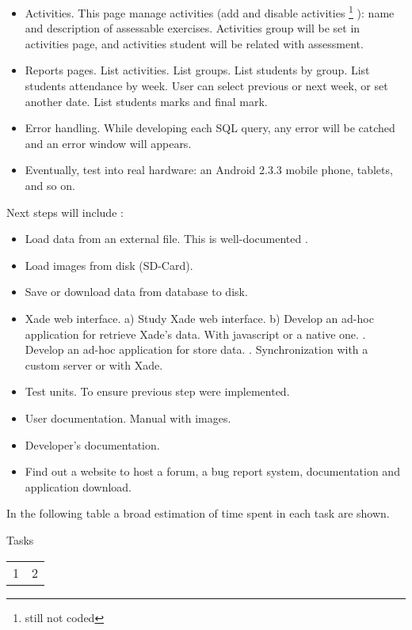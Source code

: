 \begin{itemize}
  \item  Activities. This page manage activities (add and disable activities \footnote{still not coded} ): name and description of assessable exercises. 
  \subitem  Activities group will be set in activities page, and activities student will be related with assessment.
  \item Reports pages.
  \subitem  List activities.
  \subitem  List groups.
  \subitem  List students by group.
  \subitem  List students attendance by week. User can select previous or next week, or set another date.
  \subitem  List students marks and final mark.
  
  \item Error handling. While developing each SQL query, any error will be catched and an error window will appears. 
  \item Eventually, test into real hardware: an Android 2.3.3 mobile phone, tablets, and so on.
  \end{itemize}
  
	   Next steps will include :  
  \begin{itemize}
  \item   Load data from an external file. This is well-documented \cite{}.  
  \item   Load images from disk (SD-Card).
  \item  Save or download data from database to disk.
  \item  Xade web interface.
  \subitem    a) Study Xade web interface.
  \subitem    b) Develop an ad-hoc application for retrieve Xade's data. With javascript or a native one. 
  . Develop an ad-hoc application for store data. 
  . Synchronization with a custom server or with Xade.
  \item   Test units. To ensure previous step were implemented.
  \item   User documentation. Manual with images.
  \item   Developer's documentation.
  \item   Find out a website to host a forum, a bug report system,  documentation and application download.
	\end{itemize}
	


In the following table a broad estimation of time spent in each task are shown.  

Tasks
\begin{tabular} {c|c}
1 & 2  \\
\end{tabular}

